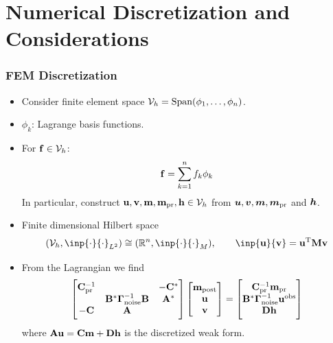 \documentclass[
  pdf,
  10pt,
  xcolor={svgnames},
]{beamer}
\newcommand{\mc}[1]{\mathcal{#1}}
\newcommand{\R}{\mathbb{R}}
\newcommand{\T}{\mathrm{T}}
\renewcommand{\vec}[1]{{\mathchoice
                     {\mbox{\boldmath$\displaystyle{#1}$}}
                     {\mbox{\boldmath$\textstyle{#1}$}}
                     {\mbox{\boldmath$\scriptstyle{#1}$}}
                     {\mbox{\boldmath$\scriptscriptstyle{#1}$}}}}
\newcommand{\mat}[1]{\mathbf{{#1}}}
\newcommand{\obs}{\mathbf{u}^{\rm obs}}
\begin{document}
\section{Numerical Discretization and Considerations}
\begin{frame}
  \frametitle{FEM Discretization}
  \begin{itemize}
    \item Consider finite element space $\mc{V}_h = {\rm Span}(\phi_1, \dots,
      \phi_n)$.
    \item $\phi_k$: Lagrange basis functions. 
    \item For $\vb{f} \in \mc{V}_h$:
      \[
        \vb{f} = \sum_{k=1}^n f_k \phi_k
      \]
    In particular, construct $\vb{u}, \vb{v}, \vb{m}, \vb{m}_{\rm pr},
      \vb{h} \in \mc{V}_h$ from $\vec{u}, \vec{v}, \vec{m}, \vec{m}_{\rm pr}$
      and $\vec{h}$.
    \item Finite dimensional Hilbert space 
      \[
        (\mc{V}_h, \inp{\cdot}{\cdot}_{L^2})
        \cong 
        (\R^n, \inp{\cdot}{\cdot}_M),
        \qquad \inp{\vb{u}}{\vb{v}} = \vb{u}^\T \mat{M} \vb{v}
      \]
    \item From the Lagrangian we find
      \[
        \begin{bmatrix}
          \mat{C}_{\rm pr}^{-1} & & -\mat{C}^* \\
          & \mat{B}^* \vb{\Gamma}_{\rm noise}^{-1} \mat{B} & \mat{A}^* \\
          -\mat{C} & \mat{A} & 
        \end{bmatrix}
        \begin{bmatrix} \vb{m}_{\rm post} \\ \vb{u} \\ \vb{v} \end{bmatrix}
        = \begin{bmatrix}
          \mat{C}_{\rm pr}^{-1} \vb{m}_{\rm pr} \\ 
          \mat{B}^* \vb{\Gamma}_{\rm noise}^{-1} \obs \\
          \mat{D} \vb{h}
        \end{bmatrix}
      \]
      where $\mat{A} \vb{u} = \mat{C} \vb{m} + \mat{D} \vb{h}$ is the discretized
      weak form.
  \end{itemize}
\end{frame}
\end{document}
